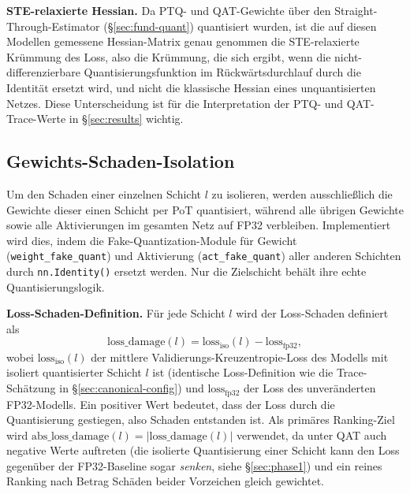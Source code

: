 \textbf{STE-relaxierte Hessian.} Da PTQ- und QAT-Gewichte über den Straight-Through-Estimator (\S\ref{sec:fund-quant}) quantisiert wurden, ist die auf diesen Modellen gemessene Hessian-Matrix genau genommen die STE-relaxierte Krümmung des Loss, also die Krümmung, die sich ergibt, wenn die nicht-differenzierbare Quantisierungsfunktion im Rückwärtsdurchlauf durch die Identität ersetzt wird, und nicht die klassische Hessian eines unquantisierten Netzes. Diese Unterscheidung ist für die Interpretation der PTQ- und QAT-Trace-Werte in \S\ref{sec:results} wichtig.

\subsection{Gewichts-Schaden-Isolation}
\label{sec:isolation}

Um den Schaden einer einzelnen Schicht $l$ zu isolieren, werden ausschließlich die Gewichte dieser einen Schicht per PoT quantisiert, während alle übrigen Gewichte sowie alle Aktivierungen im gesamten Netz auf FP32 verbleiben. Implementiert wird dies, indem die Fake-Quantization-Module für Gewicht (\texttt{weight\_fake\_quant}) und Aktivierung (\texttt{act\_fake\_quant}) aller anderen Schichten durch \texttt{nn.Identity()} ersetzt werden. Nur die Zielschicht behält ihre echte Quantisierungslogik.
\par\medskip

\textbf{Loss-Schaden-Definition.} Für jede Schicht $l$ wird der Loss-Schaden definiert als
\begin{equation}
\mathrm{loss\_damage}(l) = \mathrm{loss}_{\mathrm{iso}}(l) - \mathrm{loss}_{\mathrm{fp32}},
\label{eq:loss-damage}
\end{equation}
wobei $\mathrm{loss}_{\mathrm{iso}}(l)$ der mittlere Validierungs-Kreuzentropie-Loss des Modells mit isoliert quantisierter Schicht $l$ ist (identische Loss-Definition wie die Trace-Schätzung in \S\ref{sec:canonical-config}) und $\mathrm{loss}_{\mathrm{fp32}}$ der Loss des unveränderten FP32-Modells. Ein positiver Wert bedeutet, dass der Loss durch die Quantisierung gestiegen, also Schaden entstanden ist. Als primäres Ranking-Ziel wird $\mathrm{abs\_loss\_damage}(l) = |\mathrm{loss\_damage}(l)|$ verwendet, da unter QAT auch negative Werte auftreten (die isolierte Quantisierung einer Schicht kann den Loss gegenüber der FP32-Baseline sogar \emph{senken}, siehe \S\ref{sec:phase1}) und ein reines Ranking nach Betrag Schäden beider Vorzeichen gleich gewichtet.
\par\medskip

